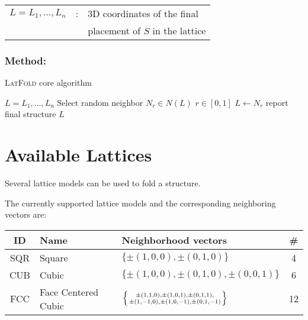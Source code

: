 \documentclass{article}
\newcommand{\latfold}{\textsc{LatFold}}
\begin{document}
\begin{tabular}{rcl}
	$L=L_1,\ldots,L_n$	&:& 3D coordinates of the final \\
						&& placement of $S$ in the lattice
\end{tabular}

\subsubsection*{Method:}


\vspace{0.5em}
\begin{algorithm}[H]
\caption{\latfold{} core algorithm}
\begin{algorithmic}[1]
\tiny
	\State $L=L_1,\ldots,L_n$ 
	\Statex {}
		\State Select random neighbor $N_r \in N(L)$
		\State $r \in [0,1]$ 
			\State $L \gets N_r$ 
		\Else {}
		\EndIf
	\EndWhile
	\State report final structure $L$
\end{algorithmic}
\end{algorithm}





\section{Available Lattices}
\label{sec:lat}

Several lattice models can be used to fold a structure. 

\vspace{0.5em}
The currently supported lattice models and the corresponding neighboring
vectors are:

\vspace{0.5em}
\begin{tabular}{c|l|l|c}
	ID & Name & Neighborhood vectors & \#\\
	\hline
	SQR & Square & $\{\pm(1,0,0),\pm(0,1,0)\}$ & 4\\
	CUB & Cubic & $\{\pm(1,0,0),\pm(0,1,0),\pm(0,0,1)\}$ & 6\\
	FCC & Face Centered Cubic & 
	$\left\{\pm(1,1,0),\pm(1,0,1),\pm(0,1,1), \atop
	\pm(1,-1,0),\pm(1,0,-1),\pm(0,1,-1)\right\}$ & 12 
\end{tabular}
\end{document}
